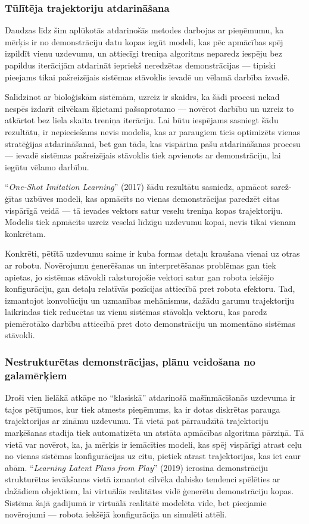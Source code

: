 \documentclass[12pt, a4paper]{article}
\numberwithin{equation}{section} %
\begin{document}
\subsubsection{Tūlītēja trajektoriju atdarināšana}

Daudzas līdz šim aplūkotās atdarinošās metodes darbojas ar pieņēmumu, ka mērķis ir no demonstrāciju datu kopas iegūt modeli, kas pēc apmācības spēj izpildīt vienu uzdevumu, un attiecīgi treniņa algoritms neparedz iespēju bez papildus iterācijām atdarināt iepriekš neredzētas demonstrācijas --- tipiski pieejams tikai pašreizējais sistēmas stāvoklis ievadē un vēlamā darbība izvadē.

Salīdzinot ar bioloģiskām sistēmām, uzreiz ir skaidrs, ka šādi procesi nekad nespēs izdarīt cilvēkam šķietami pašsaprotamo --- novērot darbību un uzreiz to atkārtot bez liela skaita treniņa iterāciju. Lai būtu iespējams sasniegt šādu rezultātu, ir nepieciešams nevis modelis, kas ar paraugiem ticis optimizēts vienas stratēģijas atdarināšanai, bet gan tāds, kas vispārina pašu atdarināšanas procesu --- ievadē sistēmas pašreizējais stāvoklis tiek apvienots ar demonstrāciju, lai iegūtu vēlamo darbību. 

``\textit{One-Shot Imitation Learning}'' \cite{duan2017one} (2017) šādu rezultātu sasniedz, apmācot sarež-ģītas uzbūves modeli, kas apmācīts no vienas demonstrācijas paredzēt citas vispārīgā veidā --- tā ievades vektors satur veselu treniņa kopas trajektoriju. Modelis tiek apmācīts uzreiz veselai līdzīgu uzdevumu kopai, nevis tikai vienam konkrētam.

Konkrēti, pētītā uzdevumu saime ir kuba formas detaļu kraušana vienai uz otras ar robotu. Novērojumu ģenerēšanas un interpretēšanas problēmas gan tiek apietas, jo sistēmas stāvokli raksturojošie vektori satur gan robota iekšējo konfigurāciju, gan detaļu relatīvās pozīcijas attiecībā pret robota efektoru. Tad, izmantojot konvolūciju un uzmanības mehānismus, dažādu garumu trajektoriju laikrindas tiek reducētas uz vienu sistēmas stāvokļa vektoru, kas paredz piemērotāko darbību attiecībā pret doto demonstrāciju un momentāno sistēmas stāvokli.

\subsubsection{Nestrukturētas demonstrācijas, plānu veidošana no galamērķiem}

Droši vien lielākā atkāpe no ``klasiskā'' atdarinošā mašīnmācīšanās uzdevuma ir tajos pētījumos, kur tiek atmests pieņēmums, ka ir dotas diskrētas parauga trajektorijas ar zināmu uzdevumu. Tā vietā pat pārraudzītā trajektoriju marķēšanas stadija tiek automatizēta un atstāta apmācības algoritma pārziņā. Tā vietā var novērot, ka, ja mērķis ir iemācīties modeli, kas spēj vispārīgi atrast ceļu no vienas sistēmas konfigurācijas uz citu, pietiek atrast trajektorijas, kas iet caur abām. ``\textit{Learning Latent Plans from Play}'' \cite{lynch2020learning} (2019) ierosina demonstrāciju strukturētas ievākšanas vietā izmantot cilvēka dabisko tendenci spēlēties ar dažādiem objektiem, lai virtuālās realitātes vidē ģenerētu demonstrāciju kopas. Sistēma šajā gadījumā ir virtuālā realitātē modelēta vide, bet pieejamie novērojumi --- robota iekšējā konfigurācija un simulēti attēli.
\end{document}
